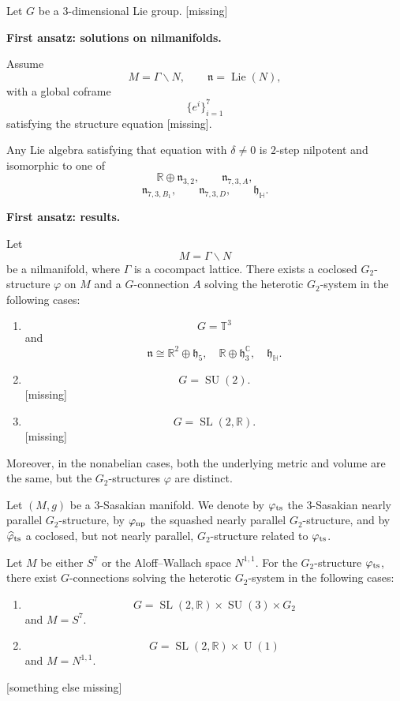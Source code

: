 Let $G$ be a $3$-dimensional Lie
group.
[missing]

\medskip\noindent
{\bf First ansatz: solutions on
nilmanifolds.}

Assume
\[
        M=\Gamma\backslash N,
        \qquad
        \mathfrak n=\operatorname{Lie}(N),
\]
with a global coframe
\[
        \{e^i\}_{i=1}^7
\]
satisfying the structure equation
[missing].

Any Lie algebra satisfying that
equation with $\delta\neq 0$ is
$2$-step nilpotent and isomorphic to
one of
\[
        \mathbb R\oplus\mathfrak n_{3,2},
        \qquad
        \mathfrak n_{7,3,A},
\]
\[
        \mathfrak n_{7,3,B_1},
        \qquad
        \mathfrak n_{7,3,D},
        \qquad
        \mathfrak h_{\mathbb H}.
\]

\medskip\noindent
{\bf First ansatz: results.}

\begin{theorem}
\label{theorem-let-m4}
Let
\[
        M=\Gamma\backslash N
\]
be a nilmanifold, where $\Gamma$ is a
cocompact lattice.
There exists a coclosed
$G_2$-structure $\varphi$ on $M$ and
a $G$-connection $A$ solving the
heterotic $G_2$-system in the
following cases:
\begin{enumerate}
\item
\[
        G=\mathbb T^3
\]
and
\[
        \mathfrak n\cong
        \mathbb R^2\oplus\mathfrak h_5,
        \quad
        \mathbb R\oplus
        \mathfrak h_3^{\mathbb C},
        \quad
        \mathfrak h_{\mathbb H}.
\]
\item
\[
        G=\operatorname{SU}(2).
\]
[missing]
\item
\[
        G=\operatorname{SL}(2,\mathbb R).
\]
[missing]
\end{enumerate}
Moreover, in the nonabelian cases,
both the underlying metric and volume
are the same, but the $G_2$-structures
$\varphi$ are distinct.
\end{theorem}

Let $(M,g)$ be a $3$-Sasakian
manifold.
We denote by $\varphi_{\rm ts}$ the
$3$-Sasakian nearly parallel
$G_2$-structure, by
$\varphi_{\rm np}$ the squashed
nearly parallel $G_2$-structure, and
by $\widehat\varphi_{\rm ts}$ a
coclosed, but not nearly parallel,
$G_2$-structure related to
$\varphi_{\rm ts}$.

\begin{theorem}
\label{theorem-let-m5}
Let $M$ be either $S^7$ or the
Aloff--Wallach space $N^{1,1}$.
For the $G_2$-structure
$\varphi_{\rm ts}$, there exist
$G$-connections solving the heterotic
$G_2$-system in the following cases:
\begin{enumerate}
\item
\[
        G=\operatorname{SL}(2,\mathbb R)
        \times\operatorname{SU}(3)
        \times G_2
\]
and $M=S^7$.
\item
\[
        G=\operatorname{SL}(2,\mathbb R)
        \times \operatorname{U}(1)
\]
and $M=N^{1,1}$.
\end{enumerate}
[something else missing]
\end{theorem}

